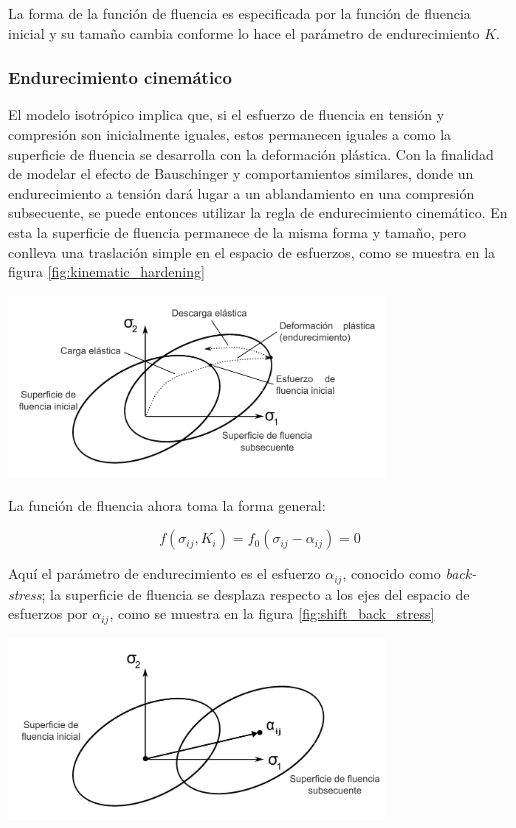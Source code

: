 La forma de la función de fluencia es especificada por la función de fluencia inicial y su 
tamaño cambia conforme lo hace el parámetro de endurecimiento $K$.


\subsubsection{Endurecimiento cinemático}

El modelo isotrópico implica que, si el esfuerzo de fluencia en tensión y compresión son 
inicialmente iguales, estos permanecen iguales a como la superficie de fluencia se desarrolla 
con la deformación plástica. Con la finalidad de modelar el efecto de Bauschinger y comportamientos 
similares, donde un endurecimiento a tensión dará lugar a un ablandamiento en una compresión 
subsecuente, se puede entonces utilizar la regla de endurecimiento cinemático. En esta 
la superficie de fluencia permanece de la misma forma y tamaño, pero conlleva una traslación simple 
en el espacio de esfuerzos, como se muestra en la figura \ref{fig:kinematic_hardening}


\begin{center}
\includegraphics[width=0.75\textwidth]{src/ch2/kinematic_hardening}
\label{fig:kinematic_hardening}
\end{center}

La función de fluencia ahora toma la forma general:

\begin{equation}
f(\sigma_{ij}, K_i) = f_0 (\sigma_{ij} - \alpha_{ij}) = 0
\end{equation}

Aquí el parámetro de endurecimiento es el esfuerzo $\alpha_{ij}$, conocido como \textit{back-stress}; 
la superficie de fluencia se desplaza respecto a los ejes del espacio de esfuerzos por $\alpha_{ij}$, 
como se muestra en la figura \ref{fig:shift_back_stress}

\begin{center}
\includegraphics[width=0.75\textwidth]{src/ch2/shift_back_stress}
\label{fig:shift_back_stress}
\end{center}


